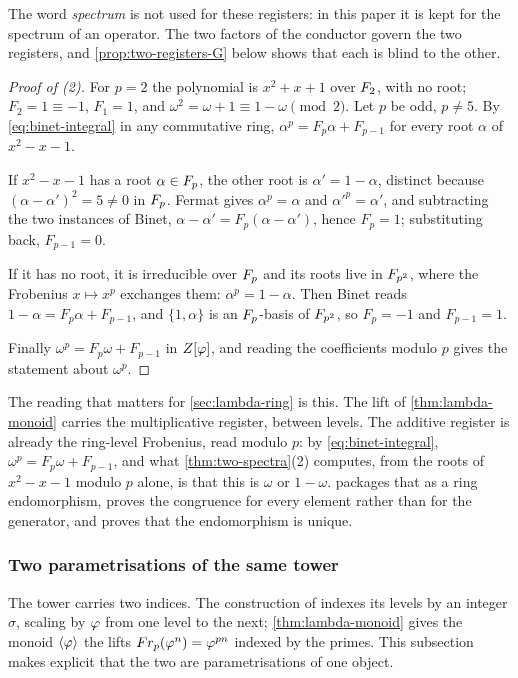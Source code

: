 The word \emph{spectrum} is not used for these registers: in this paper it is kept for the
spectrum of an operator.  The two factors of the conductor govern the two registers, and
\cref{prop:two-registers-G} below shows that each is blind to the other.

\begin{proof}[Proof of (2)]
For $p=2$ the polynomial is $x^2+x+1$ over $F_2$, with no root; $F_2=1\equiv-1$, $F_1=1$, and
$\omega^2=\omega+1\equiv1-\omega\pmod2$.  Let $p$ be odd, $p\ne5$.  By \eqref{eq:binet-integral} in
any commutative ring, $\alpha^p=F_p\alpha+F_{p-1}$ for every root $\alpha$ of $x^2-x-1$.

If $x^2-x-1$ has a root $\alpha\in F_p$, the other root is $\alpha'=1-\alpha$, distinct because
$(\alpha-\alpha')^2=5\ne0$ in $F_p$.  Fermat gives $\alpha^p=\alpha$ and
$\alpha'^p=\alpha'$, and subtracting the two instances of Binet,
$\alpha-\alpha'=F_p(\alpha-\alpha')$, hence $F_p=1$; substituting back, $F_{p-1}=0$.

If it has no root, it is irreducible over $F_p$ and its roots live in
$F_{p^2}$, where the Frobenius $x\mapsto x^p$ exchanges them: $\alpha^p=1-\alpha$.
Then Binet reads $1-\alpha=F_p\alpha+F_{p-1}$, and
$\{1,\alpha\}$ is an $F_p$-basis of $F_{p^2}$, so $F_p=-1$ and $F_{p-1}=1$.

Finally $\omega^p=F_p\omega+F_{p-1}$ in $Z[\varphi]$, and reading the coefficients modulo $p$ gives the
statement about $\omega^p$.
\end{proof}

The reading that matters for \cref{sec:lambda-ring} is this.  The lift of
\cref{thm:lambda-monoid} carries the multiplicative register, between levels.
The additive register is already the ring-level Frobenius, read modulo $p$: by
\eqref{eq:binet-integral}, $\omega^p=F_p\omega+F_{p-1}$, and what
\cref{thm:two-spectra}(2) computes, from the roots of $x^2-x-1$ modulo $p$ alone, is that this is
$\omega$ or $1-\omega$.   packages that as a ring endomorphism, proves the
congruence for every element rather than for the generator, and proves that the endomorphism is
unique.

\subsubsection{Two parametrisations of the same tower}\label{ssec:two-params}

The tower carries two indices.  The construction of \cite[\S2.8]{gonzalez26cw}
indexes its levels by an integer $\sigma$, scaling by $\varphi$ from one level to the
next; \cref{thm:lambda-monoid} gives the monoid $\langle\varphi\rangle$ the lifts
$Fr_p(\varphi^n)=\varphi^{pn}$ indexed by the primes.  This subsection makes
explicit that the two are parametrisations of one object.

